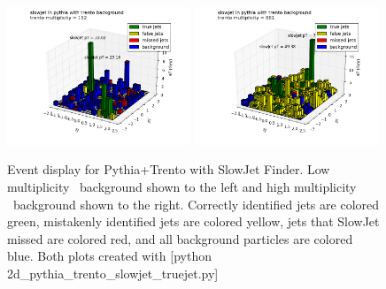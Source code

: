 \documentclass[11pt]{article}
\begin{document}
\begin{figure}[h]
\begin{center}
\includegraphics[width=0.49\textwidth]{2d_pythia_trento_slowjet_truejet1.png}
\includegraphics[width=0.49\textwidth]{2d_pythia_trento_slowjet_truejet2.png}
\caption{Event display for Pythia+Trento with SlowJet Finder. Low multiplicity \trento\ background shown to the left and high multiplicity \trento\ background shown to the right. Correctly identified jets are colored green, mistakenly identified jets are colored yellow, jets that SlowJet missed are colored red, and all background particles are colored blue. Both plots created with [python 2d\_pythia\_trento\_slowjet\_truejet.py]}
\label{fig_2d_pythia_trento_slowjet_truejet}
\end{center}
\end{figure}
\end{document}
